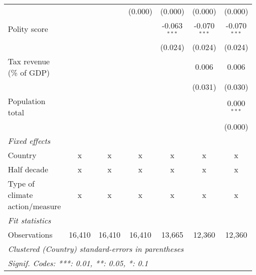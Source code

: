 \begin{tabular}{lcccccc}
                                                                                &              &              & (0.000)      & (0.000)        & (0.000)        & (0.000)\\   
   Polity score                                                                 &              &              &              & -0.063$^{***}$ & -0.070$^{***}$ & -0.070$^{***}$\\   
                                                                                &              &              &              & (0.024)        & (0.024)        & (0.024)\\   
   Tax revenue (\% of GDP)                                                      &              &              &              &                & 0.006          & 0.006\\   
                                                                                &              &              &              &                & (0.031)        & (0.030)\\   
   Population total                                                             &              &              &              &                &                & 0.000$^{***}$\\   
                                                                                &              &              &              &                &                & (0.000)\\   
   \emph{Fixed effects}\\
   Country                                                                      & x            & x            & x            & x              & x              & x\\  
   Half decade                                                                  & x            & x            & x            & x              & x              & x\\  
   Type of climate action/measure                                               & x            & x            & x            & x              & x              & x\\  
   \midrule \emph{Fit statistics}\\
   Observations                                                                 & 16,410       & 16,410       & 16,410       & 13,665         & 12,360         & 12,360\\  
   \midrule
   \multicolumn{7}{l}{\emph{Clustered (Country) standard-errors in parentheses}}\\
   \multicolumn{7}{l}{\emph{Signif. Codes: ***: 0.01, **: 0.05, *: 0.1}}\\
\end{tabular}
\par\endgroup


